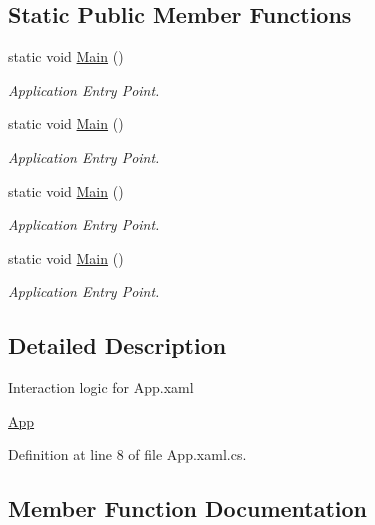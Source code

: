 \subsection*{Static Public Member Functions}
\begin{DoxyCompactItemize}
\item 
static void \hyperlink{class_c_p_u___o_s___simulator_1_1_app_a7bbb69f458b77923e336283b1653ce69}{Main} ()
\begin{DoxyCompactList}\small\item\em Application Entry Point. \end{DoxyCompactList}\item 
static void \hyperlink{class_c_p_u___o_s___simulator_1_1_app_a7bbb69f458b77923e336283b1653ce69}{Main} ()
\begin{DoxyCompactList}\small\item\em Application Entry Point. \end{DoxyCompactList}\item 
static void \hyperlink{class_c_p_u___o_s___simulator_1_1_app_a7bbb69f458b77923e336283b1653ce69}{Main} ()
\begin{DoxyCompactList}\small\item\em Application Entry Point. \end{DoxyCompactList}\item 
static void \hyperlink{class_c_p_u___o_s___simulator_1_1_app_a7bbb69f458b77923e336283b1653ce69}{Main} ()
\begin{DoxyCompactList}\small\item\em Application Entry Point. \end{DoxyCompactList}\end{DoxyCompactItemize}


\subsection{Detailed Description}
Interaction logic for App.\+xaml 

\hyperlink{class_c_p_u___o_s___simulator_1_1_app}{App} 

Definition at line 8 of file App.\+xaml.\+cs.



\subsection{Member Function Documentation}
\hypertarget{class_c_p_u___o_s___simulator_1_1_app_a15e2e0e02c8dbe7d5d3fba5d21f3e56f}{}
